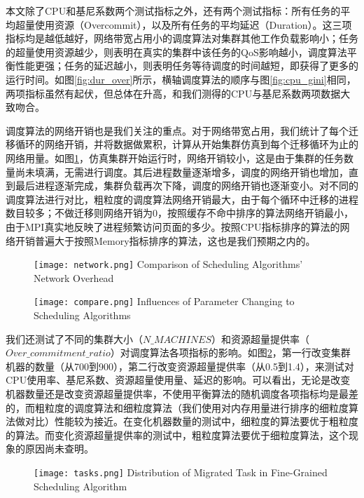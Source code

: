本文除了CPU和基尼系数两个测试指标之外，还有两个测试指标：所有任务的平均超量使用资源（Overcommit），以及所有任务的平均延迟（Duration）。这三项指标均是越低越好，网络带宽占用小的调度算法对集群其他工作负载影响小；任务的超量使用资源越少，则表明在真实的集群中该任务的QoS影响越小，调度算法平衡性能更强；任务的延迟越小，则表明任务等待调度的时间越短，即获得了更多的运行时间。如图\ref{fig:dur_over}所示，横轴调度算法的顺序与图\ref{fig:cpu_gini}相同，两项指标虽然有起伏，但总体在升高，和我们测得的CPU与基尼系数两项数据大致吻合。

调度算法的网络开销也是我们关注的重点。对于网络带宽占用，我们统计了每个迁移循环的网络开销，并将数据做累积，计算从开始集群仿真到每个迁移循环为止的网络用量。如图\ref{fig:minetwork}，仿真集群开始运行时，网络开销较小，这是由于集群的任务数量尚未填满，无需进行调度。其后进程数量逐渐增多，调度的网络开销也增加，直到最后进程逐渐完成，集群负载再次下降，调度的网络开销也逐渐变小。对不同的调度算法进行对比，粗粒度的调度算法网络开销最大，由于每个循环中迁移的进程数目较多；不做迁移则网络开销为0，按照缓存不命中排序的算法网络开销最小，由于MPI真实地反映了进程频繁访问页面的多少。按照CPU指标排序的算法的网络开销普遍大于按照Memory指标排序的算法，这也是我们预期之内的。
\begin{figure}[!htp]
  \centering
  \texttt{[image: network.png]}
    {Comparison of Scheduling Algorithms' Network Overhead}
  \label{fig:minetwork}
\end{figure}

\begin{figure}[!htp]
  \centering
  \texttt{[image: compare.png]}
    {Influences of Parameter Changing to Scheduling Algorithms}
  \label{fig:comparing}
\end{figure}

我们还测试了不同的集群大小（$N\_MACHINES$）和资源超量提供率（$Over\_commitment\_ratio$）对调度算法各项指标的影响。如图\ref{fig:comparing}，第一行改变集群机器的数量（从700到900），第二行改变资源超量提供率（从0.5到1.4），来测试对CPU使用率、基尼系数、资源超量使用量、延迟的影响。可以看出，无论是改变机器数量还是改变资源超量提供率，不使用平衡算法的随机调度各项指标均是最差的，而粗粒度的调度算法和细粒度算法（我们使用对内存用量进行排序的细粒度算法做对比）性能较为接近。在变化机器数量的测试中，细粒度的算法要优于粗粒度的算法。而变化资源超量提供率的测试中，粗粒度算法要优于细粒度算法，这个现象的原因尚未查明。

\begin{figure}[!htp]
  \centering
  \texttt{[image: tasks.png]}
    {Distribution of Migrated Task in Fine-Grained Scheduling Algorithm}
  \label{fig:distr}
\end{figure}

